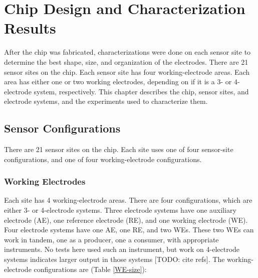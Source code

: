 \chapter{Chip Design and Characterization Results}

After the chip was fabricated, characterizations were done on each sensor site to determine the best shape, size, and organization of the electrodes. There are 21 sensor sites on the chip. Each sensor site has four working-electrode areas. Each area has either one or two working electrodes, depending on if it is a 3- or 4-electrode system, respectively. This chapter describes the chip, sensor sites, and electrode systems, and the experiments used to characterize them.

\section{Sensor Configurations}

There are 21 sensor sites on the chip. Each site uses one of four sensor-site configurations, and one of four working-electrode configurations.

\subsection{Working Electrodes}

Each site has 4 working-electrode areas. There are four configurations, which are either 3- or 4-electrode systems. Three electrode systems have one auxiliary electrode (AE), one reference electrode (RE), and one working electrode (WE). Four electrode systems have one AE, one RE, and two WEs. These two WEs can work in tandem, one as a producer, one a consumer, with appropriate instruments. No tests here used such an instrument, but work on 4-electrode systems indicates larger output in those systems [TODO: cite refs]. The working-electrode configurations are (Table \ref{WE-size}):

